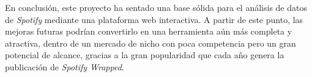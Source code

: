 En conclusión, este proyecto ha sentado una base sólida para el análisis de datos de \textit{Spotify} mediante una plataforma web interactiva. A partir de este punto, las mejoras futuras podrían convertirlo en una herramienta aún más completa y atractiva, dentro de un mercado de nicho con poca competencia pero un gran potencial de alcance, gracias a la gran popularidad que cada año genera la publicación de \textit{Spotify Wrapped}.

